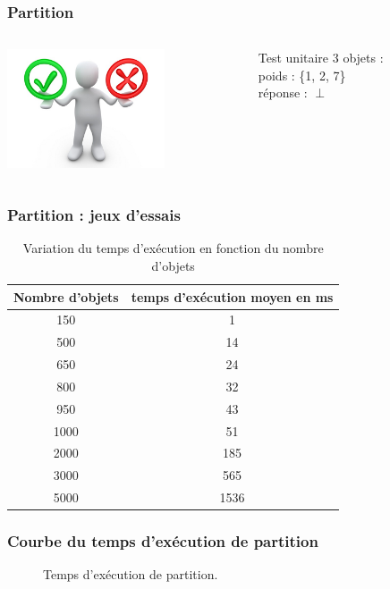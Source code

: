 \documentclass[french]{beamer}
\begin{document}
\begin{frame}
  \frametitle{Partition}
  \begin{columns}
    \begin{column}[]{4cm}
      \begin{center}
        \includegraphics[height=3.5cm]{../images/unitest.jpg}
      \end{center}
    \end{column}
      \begin{column}[]{6cm}
        \begin{block}{Test unitaire}
	3 objets : \\
	poids : \{1, 2, 7\} \\
	réponse : $\perp$
        \end{block}
      \end{column}
    \end{columns}
\end{frame}
  \begin{frame}
  \frametitle{Partition : jeux d'essais}

\begin{table}[h!]
\centering
\begin{tabular}{|c|c|}
\hline
Nombre d'objets & temps d'exécution moyen en ms\\
\hline
150 & 1\\
\hline
500 & 14\\
\hline
650 & 24\\
\hline
800 & 32\\
\hline
950 & 43\\
\hline
1000 & 51\\
\hline
2000 & 185\\
\hline
3000 & 565\\
\hline
5000 & 1536\\
\hline
\end{tabular}
\caption {Variation du temps d'exécution en fonction du nombre d'objets}
\end{table}
\end{frame}

\begin{frame}
\frametitle{Courbe du temps d'exécution de partition}
\begin{figure}[h!]
\centering
{}
\caption{Temps d'exécution de partition.}
\end{figure}

  \end{frame}
  
\end{document}
